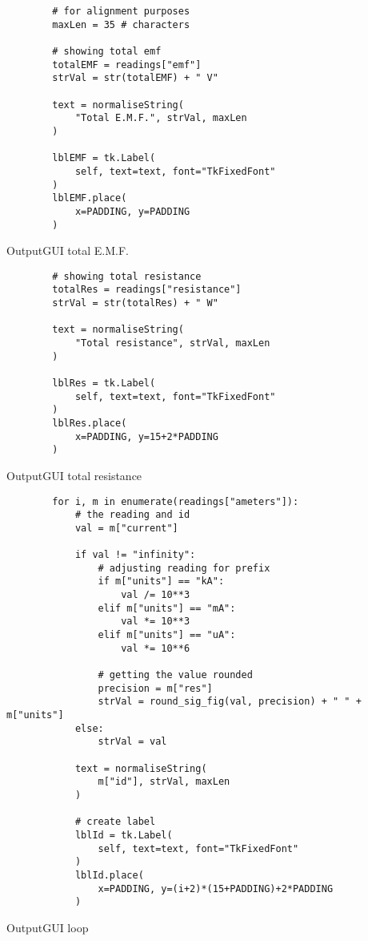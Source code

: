 \newpage
\begin{listing}[!ht]
    \begin{verbatim}
        # for alignment purposes
        maxLen = 35 # characters
        
        # showing total emf 
        totalEMF = readings["emf"]
        strVal = str(totalEMF) + " V"
        
        text = normaliseString(
            "Total E.M.F.", strVal, maxLen
        )

        lblEMF = tk.Label(
            self, text=text, font="TkFixedFont"
        )
        lblEMF.place(
            x=PADDING, y=PADDING
        )
    \end{verbatim}
    \caption{OutputGUI total E.M.F.}
    \label{sc:outputgui-total-emf}
\end{listing}

\newpage
\begin{listing}[!ht]
    \begin{verbatim}
        # showing total resistance
        totalRes = readings["resistance"]
        strVal = str(totalRes) + " W"

        text = normaliseString(
            "Total resistance", strVal, maxLen
        )

        lblRes = tk.Label(
            self, text=text, font="TkFixedFont"
        )
        lblRes.place(
            x=PADDING, y=15+2*PADDING
        )
    \end{verbatim}
    \caption{OutputGUI total resistance}
    \label{sc:outputgui-total-resistance}
\end{listing}

\newpage
\begin{listing}[!ht]
    \begin{verbatim}
        for i, m in enumerate(readings["ameters"]):
            # the reading and id
            val = m["current"]
            
            if val != "infinity":
                # adjusting reading for prefix
                if m["units"] == "kA":
                    val /= 10**3
                elif m["units"] == "mA":
                    val *= 10**3
                elif m["units"] == "uA":
                    val *= 10**6
                    
                # getting the value rounded
                precision = m["res"]
                strVal = round_sig_fig(val, precision) + " " + m["units"]
            else:
                strVal = val
            
            text = normaliseString(
                m["id"], strVal, maxLen
            )
                
            # create label
            lblId = tk.Label(
                self, text=text, font="TkFixedFont"
            )
            lblId.place(
                x=PADDING, y=(i+2)*(15+PADDING)+2*PADDING
            )
    \end{verbatim}
    \caption{OutputGUI loop}
    \label{sc:outputgui-loop}
\end{listing}


